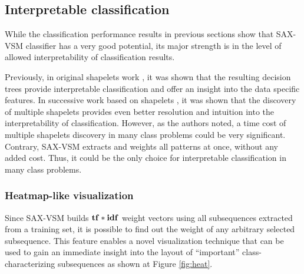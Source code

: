 \subsection{Interpretable classification}
While the classification performance results in previous sections show that SAX-VSM 
classifier has a very good potential, its major strength is in the level of allowed 
interpretability of classification results. 

Previously, in original shapelets work \cite{citeulike:7344347, citeulike:11957982}, it was shown that the 
resulting decision trees provide interpretable classification and offer an insight into the data
specific features. In successive work based on shapelets \cite{citeulike:11345338}, it was shown that
the discovery of multiple shapelets provides even better resolution and intuition into 
the interpretability of classification. 
However, as the authors noted, a time cost of multiple shapelets discovery
in many class problems could be very significant. 
Contrary, SAX-VSM extracts and weights all patterns at once, without any added cost. Thus, it could
be the only choice for interpretable classification in many class problems.

\subsubsection{Heatmap-like visualization}
Since SAX-VSM builds $\text{\textbf{tf}}\ast\text{\textbf{idf}}$ weight vectors using all subsequences extracted from a
training set, it is possible to find out the weight of any arbitrary selected subsequence.
This feature enables a novel visualization technique that can be used to gain an immediate
insight into the layout of ``important'' class-characterizing subsequences as shown at Figure
\ref{fig:heat}.

